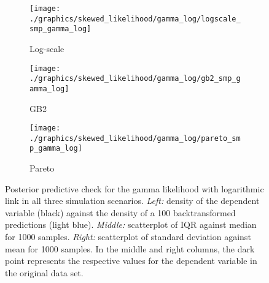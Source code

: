 \begin{figure}
    \begin{subfigure}{\textwidth}
        \texttt{[image: ./graphics/skewed\_likelihood/gamma\_log/logscale\_smp\_gamma\_log]}
        \caption{Log-scale}
    \end{subfigure}
    \newline
    \begin{subfigure}{\textwidth}
        \texttt{[image: ./graphics/skewed\_likelihood/gamma\_log/gb2\_smp\_gamma\_log]}
        \caption{GB2}
    \end{subfigure}
    \newline
    \begin{subfigure}{\textwidth}
        \texttt{[image: ./graphics/skewed\_likelihood/gamma\_log/pareto\_smp\_gamma\_log]}
        \caption{Pareto}
    \end{subfigure}
    \caption[Posterior predictive check for the gamma likelihood in all three simulation scenarios.]{Posterior predictive check for the gamma likelihood with logarithmic link in all three simulation scenarios. \textit{Left:} density of the dependent variable (black) against the  density of a 100 backtransformed predictions (light blue). \textit{Middle:} scatterplot of IQR against median for 1000 samples. \textit{Right:} scatterplot of standard deviation against mean for 1000 samples. In the middle and right columns, the dark point represents the respective values for the dependent variable in the original data set.}
    \label{fig:ppc_gamma_log}
\end{figure}



